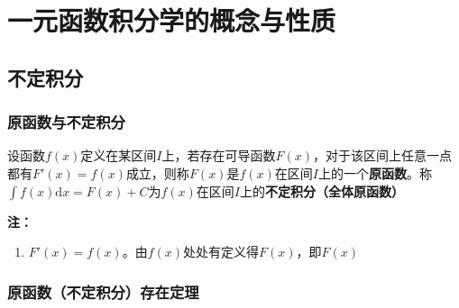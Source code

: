 \documentclass[a4paper,12pt]{article}
\begin{document}



    \section{一元函数积分学的概念与性质}

    \subsection{不定积分}

    \subsubsection{原函数与不定积分}

    设函数$f(x)$定义在某区间$I$上，若存在可导函数$F(x)$，对于该区间上任意一点都有$F'(x) = f(x)$成立，则称$F(x)$是$f(x)$在区间$I$上的一个\textbf{原函数}。称$\int f(x)\mathrm{d}x = F(x) + C$为$f(x)$在区间$I$上的\textbf{不定积分（全体原函数）}

    \medskip
    \noindent\textbf{注：}
    \begin{enumerate}
        \item $F'(x) = f(x)$。由$f(x)$处处有定义得$F(x)${\color{red}{处处可导}}，即$F(x)${\color{red}{处处连续}}
    \end{enumerate}

    \subsubsection{原函数（不定积分）存在定理}
\end{document}
